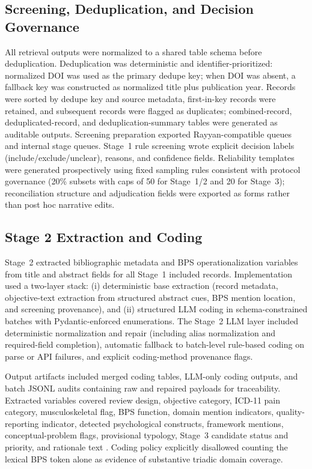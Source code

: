 \documentclass[11pt]{article}
\begin{document}
\subsection{Screening, Deduplication, and Decision Governance}
All retrieval outputs were normalized to a shared table schema before deduplication. Deduplication was deterministic and identifier-prioritized: normalized DOI was used as the primary dedupe key; when DOI was absent, a fallback key was constructed as normalized title plus publication year. Records were sorted by dedupe key and source metadata, first-in-key records were retained, and subsequent records were flagged as duplicates; combined-record, deduplicated-record, and deduplication-summary tables were generated as auditable outputs. Screening preparation exported Rayyan-compatible queues and internal stage queues. Stage~1 rule screening wrote explicit decision labels (include/exclude/unclear), reasons, and confidence fields. Reliability templates were generated prospectively using fixed sampling rules consistent with protocol governance (20\% subsets with caps of 50 for Stage~1/2 and 20 for Stage~3); reconciliation structure and adjudication fields were exported as forms rather than post hoc narrative edits.

\subsection{Stage 2 Extraction and Coding}
Stage~2 extracted bibliographic metadata and BPS operationalization variables from title and abstract fields for all Stage~1 included records. Implementation used a two-layer stack: (i) deterministic base extraction (record metadata, objective-text extraction from structured abstract cues, BPS mention location, and screening provenance), and (ii) structured LLM coding in schema-constrained batches with Pydantic-enforced enumerations. The Stage~2 LLM layer included deterministic normalization and repair (including alias normalization and required-field completion), automatic fallback to batch-level rule-based coding on parse or API failures, and explicit coding-method provenance flags.

\begin{sloppypar}
Output artifacts included merged coding tables, LLM-only coding outputs, and batch JSONL audits containing raw and repaired payloads for traceability. Extracted variables covered review design, objective category, ICD-11 pain category, musculoskeletal flag, BPS function, domain mention indicators, quality-reporting indicator, detected psychological constructs, framework mentions, conceptual-problem flags, provisional typology, Stage~3 candidate status and priority, and rationale text \citep{treede2019, nicholas2019}. Coding policy explicitly disallowed counting the lexical BPS token alone as evidence of substantive triadic domain coverage.
\end{sloppypar}
\end{document}
